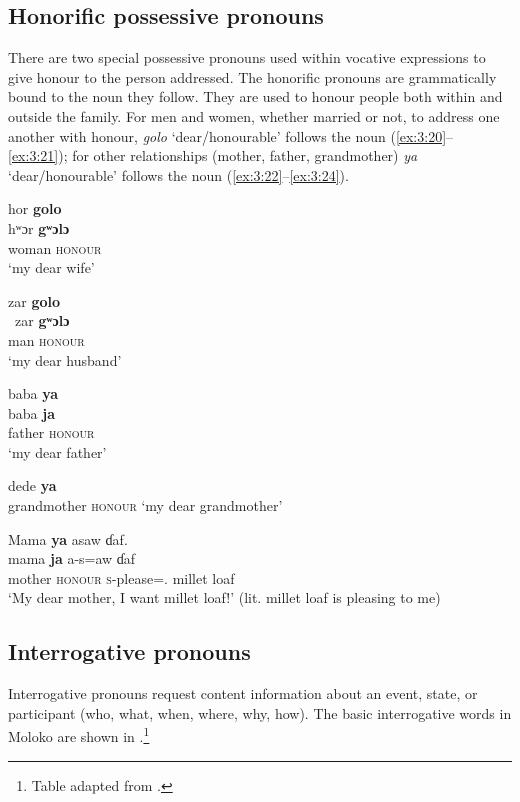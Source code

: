 \subsection{Honorific possessive pronouns}\label{sec:3.1.3}
\hypertarget{RefHeading1210881525720847}{}
There are two special possessive pronouns used within vocative expressions to give honour to the person addressed.  The honorific pronouns are grammatically bound to the noun they follow.  They are used to honour people both within and outside the family. For men and women, whether married or not, to address one another with honour, \textit{golo} ‘dear/honourable’ follows the noun (\ref{ex:3:20}--\ref{ex:3:21}); for other relationships (mother, father, grandmother)  \textit{ya} ‘dear/honourable’ follows the noun (\ref{ex:3:22}--\ref{ex:3:24}). 


\ea \label{ex:3:20}
hor  \textbf{golo} \\
\gll  hʷɔr \textbf{gʷɔlɔ}\\
      woman  \textsc{honour}\\
\glt  `my dear wife'
\z

\ea \label{ex:3:21}
zar  \textbf{golo}\\
\gll  \ zar     \textbf{gʷɔlɔ} \\
      man    \textsc{honour}\\
\glt  `my dear husband'
\z

\ea \label{ex:3:22}
baba  \textbf{ya} \\
\gll  baba  \textbf{ja}\\
      father  \textsc{honour}\\
\glt  `my dear father'
\z

\ea \label{ex:3:23}
 dede  \textbf{ya}\\
      grandmother  \textsc{honour}
\glt  `my dear grandmother'
\z

\ea \label{ex:3:24}
Mama  \textbf{ya}  asaw  ɗaf.\\
\gll  mama  \textbf{ja}     a-s=aw      ɗaf\\
      mother  \textsc{honour}  \textsc{s}-please={\oneS}.{\IO}    {millet loaf}\\
\glt  `My dear mother, I want millet loaf!' (lit. millet loaf is pleasing to me)
\z

\subsection{Interrogative pronouns}\label{sec:3.1.4}
\hypertarget{RefHeading1210901525720847}{}
Interrogative pronouns request content information about an event, state, or participant (who, what, when, where, why, how). The basic interrogative words in Moloko are shown in .\footnote{Table adapted from \citealt{Boyd2003}.} 

